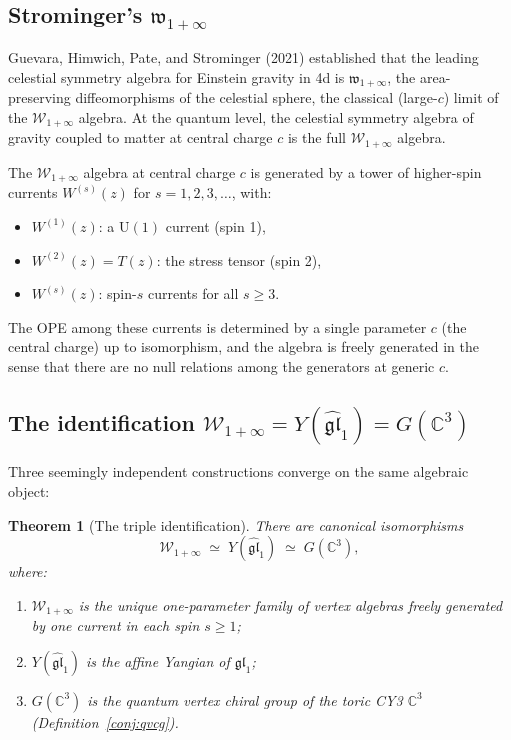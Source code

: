 \documentclass[11pt]{article}
\newtheorem{theorem}{Theorem}[section]
\theoremstyle{definition}
\theoremstyle{remark}
\newcommand{\cW}{\mathcal{W}}
\begin{document}
\subsection{Strominger's $\mathfrak{w}_{1+\infty}$}

Guevara, Himwich, Pate, and Strominger (2021) established that the
leading celestial symmetry algebra for Einstein gravity in 4d is
$\mathfrak{w}_{1+\infty}$, the area-preserving diffeomorphisms of
the celestial sphere, the classical (large-$c$) limit of the
$\cW_{1+\infty}$ algebra. At the quantum level, the celestial
symmetry algebra of gravity coupled to matter at central
charge $c$ is the full $\cW_{1+\infty}$ algebra.

The $\cW_{1+\infty}$ algebra at central charge $c$ is generated
by a tower of higher-spin currents $W^{(s)}(z)$ for $s = 1, 2,
3, \ldots$, with:
\begin{itemize}
\item $W^{(1)}(z)$: a $\mathrm{U}(1)$ current (spin 1),
\item $W^{(2)}(z) = T(z)$: the stress tensor (spin 2),
\item $W^{(s)}(z)$: spin-$s$ currents for all $s \geq 3$.
\end{itemize}
The OPE among these currents is determined by a single parameter
$c$ (the central charge) up to isomorphism, and the algebra is
freely generated in the sense that there are no null relations
among the generators at generic $c$.

\subsection{The identification $\cW_{1+\infty} = Y(\widehat{\mathfrak{gl}}_1) = G(\mathbb{C}^3)$}

Three seemingly independent constructions converge on the same
algebraic object:

\begin{theorem}[The triple identification]
\label{thm:triple-identification}
There are canonical isomorphisms
\begin{equation}\label{eq:triple-id}
\cW_{1+\infty}
\;\simeq\;
Y(\widehat{\mathfrak{gl}}_1)
\;\simeq\;
G(\mathbb{C}^3),
\end{equation}
where:
\begin{enumerate}[label=(\roman*)]
\item $\cW_{1+\infty}$ is the unique one-parameter family of vertex
 algebras freely generated by one current in each spin $s \geq 1$;
\item $Y(\widehat{\mathfrak{gl}}_1)$ is the affine Yangian of
 $\mathfrak{gl}_1$;
\item $G(\mathbb{C}^3)$ is the quantum vertex chiral group of the
 toric CY3 $\mathbb{C}^3$ (Definition~\ref{conj:qvcg}).
\end{enumerate}
\end{theorem}
\end{document}
